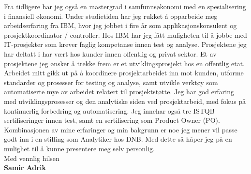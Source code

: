 \documentclass{article}
\begin{document}
\noindent Fra tidligere har jeg også en mastergrad i samfunnsøkonomi med en spesialisering i finansiell økonomi. Under studietiden har jeg rukket å opparbeide meg arbeidserfaring fra IBM, hvor jeg jobbet i fire år som applikasjonskonsulent og prosjektkoordinator / controller. Hos IBM har jeg fått muligheten til å jobbe med IT-prosjekter som krever faglig kompetanse innen test og analyse. Prosjektene jeg har deltatt i har vært hos kunder innen offentlig og privat sektor. Et av prosjektene jeg ønsker å trekke frem er et utviklingsprosjekt hos en offentlig etat. Arbeidet mitt gikk ut på å koordinere prosjektarbeidet inn mot kunden, utforme standarder og prosesser for testing og analyse, samt utvikle verktøy som automatiserte mye av arbeidet relatert til prosjektstøtte. Jeg har god erfaring med utviklingsprosesser og den analytiske siden ved prosjektarbeid, med fokus på kontinuerlig forbedring og automatisering. Jeg innehar også tre ISTQB sertifiseringer innen test, samt en sertifisering som Product Owner (PO).\\

\noindent Kombinasjonen av mine erfaringer og min bakgrunn er noe jeg mener vil passe godt inn i en stilling som Analytiker hos DNB. Med dette så håper jeg på en mulighet til å kunne presentere meg selv personlig.\\

\noindent Med vennlig hilsen\\

\noindent \textbf{Samir Adrik}\\
\end{document}
